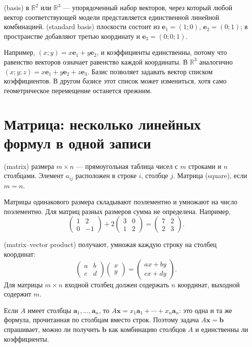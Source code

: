 \begin{definition}
 (basis) в \(\mathbb R^2\) или \(\mathbb R^3\) — упорядоченный набор векторов, через который любой вектор соответствующей модели представляется единственной линейной комбинацией.  (standard basis) плоскости состоит из \(\symbf e_1=(1;0)\), \(\symbf e_2=(0;1)\); в пространстве добавляют третью координату и \(\symbf e_3=(0;0;1)\).
\end{definition}
Например, \((x;y)=x\symbf e_1+y\symbf e_2\), и коэффициенты единственны, потому что равенство векторов означает равенство каждой координаты. В \(\mathbb R^3\) аналогично \((x;y;z)=x\symbf e_1+y\symbf e_2+z\symbf e_3\). Базис позволяет задавать вектор списком коэффициентов. В другом базисе этот список может измениться, хотя само геометрическое перемещение останется прежним.

\section{Матрица: несколько линейных формул в одной записи}
\begin{definition}
 (matrix) размера \(m\times n\) — прямоугольная таблица чисел с \(m\) строками и \(n\) столбцами. Элемент \(a_{ij}\) расположен в строке \(i\), столбце \(j\). Матрица  (square), если \(m=n\).
\end{definition}
Матрицы одинакового размера складывают поэлементно и умножают на число поэлементно. Для матриц разных размеров сумма не определена. Например,
\[
\begin{pmatrix}1&2\\0&-1\end{pmatrix}
+2\begin{pmatrix}3&0\\1&2\end{pmatrix}
=\begin{pmatrix}7&2\\2&3\end{pmatrix}.
\]
\begin{definition}
 (matrix--vector product) получают, умножая каждую строку на столбец координат:
\[
\begin{pmatrix}a&b\\c&d\end{pmatrix}
\begin{pmatrix}x\\y\end{pmatrix}
=\begin{pmatrix}ax+by\\cx+dy\end{pmatrix}.
\]
Для матрицы \(m\times n\) входной столбец должен содержать \(n\) координат, выходной содержит \(m\).
\end{definition}
Если \(A\) имеет столбцы \(\symbf a_1,\ldots,\symbf a_n\), то \(A\symbf x=x_1\symbf a_1+\cdots+x_n\symbf a_n\): это одна и та же формула, прочитанная по столбцам вместо строк. Поэтому задача \(A\symbf x=\symbf b\) спрашивает, можно ли получить \(\symbf b\) как комбинацию столбцов \(A\) и единственны ли коэффициенты.


